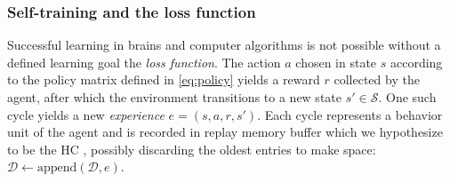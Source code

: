 \documentclass[10pt,letterpaper]{article}
\begin{document}

  \subsubsection{Self-training and the loss function}
  \label{sec:self}
Successful learning in brains and computer algorithms is not possible without a
defined learning goal \textemdash the \textit{loss function}.
The action $a$ chosen in state $s$ according to the policy matrix defined in
\eqref{eq:policy} yields a reward $r$ collected by the agent,
after which the environment transitions to a new state $s' \in \mathcal S$.
One such cycle yields a new \textit{experience} $e = (s,a,r,s')$.
Each cycle represents a behavior unit of the agent
and is recorded in replay memory buffer \textemdash which we hypothesize to be the
HC \textemdash, possibly discarding the oldest entries to make space:
$\mathcal D \leftarrow \text{append}(\mathcal D, e)$.
\end{document}
